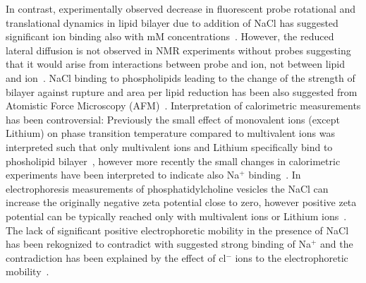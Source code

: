 \documentclass[pre,aps,floatfix,authordate1-4,twocolumn]{revtex4-1}
\begin{document}

In contrast, experimentally observed decrease in fluorescent probe rotational and translational dynamics
in lipid bilayer due to addition of NaCl has suggested significant ion binding also with mM 
concentrations~\cite{bockmann03,vacha09a,harb13}. However, the reduced lateral diffusion is not observed
in NMR experiments without probes suggesting that it would arise from interactions between probe and ion,
not between lipid and ion~\cite{filippov09}. NaCl binding to phospholipids leading to the change of the strength of 
bilayer against rupture and area per lipid reduction has been also suggested from Atomistic Force Microscopy (AFM)~\cite{manyes05,manyes06,fukuma07,ferber11,morata12}.
Interpretation of calorimetric measurements has been controversial: Previously the small effect of
monovalent ions (except Lithium)  on phase transition temperature compared to multivalent ions was interpreted such that 
only multivalent ions and Lithium specifically bind to phosholipid bilayer~\cite{cevc90}, however more recently the
small changes in calorimetric experiments have been interpreted to indicate also Na$^+$ binding~\cite{bockmann03,klasczyk10}.
In electrophoresis measurements of phosphatidylcholine vesicles the NaCl can increase the originally negative zeta potential 
close to zero, however positive zeta potential can be typically reached only with multivalent ions or Lithium
ions~\cite{eisenberg79,tatulian87,manyes05,manyes06,klasczyk10}. The lack of significant positive electrophoretic mobility in the presence
of NaCl has been rekognized to contradict with suggested strong binding of Na$^+$ and the contradiction
has been explained by the effect of cl$^-$ ions to the electrophoretic mobility~\cite{berkowitz06,knecht13}.
 
\end{document}

